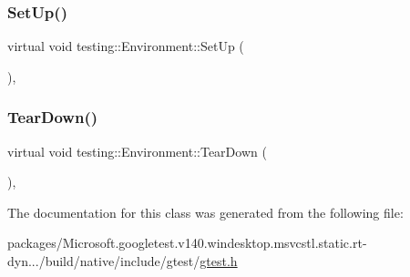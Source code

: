 \subsubsection{\texorpdfstring{SetUp()}{SetUp()}}
{\footnotesize\ttfamily virtual void testing\+::\+Environment\+::\+Set\+Up (\begin{DoxyParamCaption}{ }\end{DoxyParamCaption})\hspace{0.3cm}{\ttfamily [inline]}, {\ttfamily [virtual]}}

\mbox{\label{classtesting_1_1_environment_a039bdaa705c46b9b88234cf4d3bb6254}} 
\subsubsection{\texorpdfstring{TearDown()}{TearDown()}}
{\footnotesize\ttfamily virtual void testing\+::\+Environment\+::\+Tear\+Down (\begin{DoxyParamCaption}{ }\end{DoxyParamCaption})\hspace{0.3cm}{\ttfamily [inline]}, {\ttfamily [virtual]}}



The documentation for this class was generated from the following file\+:\begin{DoxyCompactItemize}
\item 
packages/\+Microsoft.\+googletest.\+v140.\+windesktop.\+msvcstl.\+static.\+rt-\/dyn.../build/native/include/gtest/\mbox{\hyperlink{gtest_8h}{gtest.\+h}}\end{DoxyCompactItemize}
